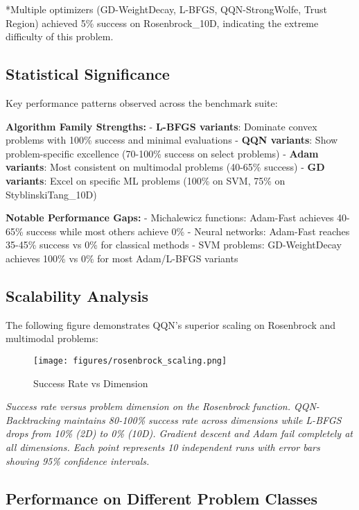 *Multiple optimizers (GD-WeightDecay, L-BFGS, QQN-StrongWolfe, Trust Region) achieved 5\% success on Rosenbrock\_10D, indicating the extreme difficulty of this problem.

\hypertarget{statistical-significance}{%
\subsection{Statistical Significance}\label{statistical-significance}}

Key performance patterns observed across the benchmark suite:

\textbf{Algorithm Family Strengths:}
- \textbf{L-BFGS variants}: Dominate convex problems with 100\% success and minimal evaluations
- \textbf{QQN variants}: Show problem-specific excellence (70-100\% success on select problems)
- \textbf{Adam variants}: Most consistent on multimodal problems (40-65\% success)
- \textbf{GD variants}: Excel on specific ML problems (100\% on SVM, 75\% on StyblinskiTang\_10D)

\textbf{Notable Performance Gaps:}
- Michalewicz functions: Adam-Fast achieves 40-65\% success while most others achieve 0\%
- Neural networks: Adam-Fast reaches 35-45\% success vs 0\% for classical methods
- SVM problems: GD-WeightDecay achieves 100\% vs 0\% for most Adam/L-BFGS variants

\hypertarget{scalability-analysis}{%
\subsection{Scalability Analysis}\label{scalability-analysis}}

The following figure demonstrates QQN's superior scaling on Rosenbrock and multimodal problems:

\begin{figure}
\centering
\texttt{[image: figures/rosenbrock\_scaling.png]}
\caption{Success Rate vs Dimension}
\end{figure}

\emph{Success rate versus problem dimension on the Rosenbrock function. QQN-Backtracking maintains 80-100\% success rate across dimensions while L-BFGS drops from 10\% (2D) to 0\% (10D). Gradient descent and Adam fail completely at all dimensions. Each point represents 10 independent runs with error bars showing 95\% confidence intervals.}

\hypertarget{performance-on-different-problem-classes}{%
\subsection{Performance on Different Problem Classes}\label{performance-on-different-problem-classes}}

